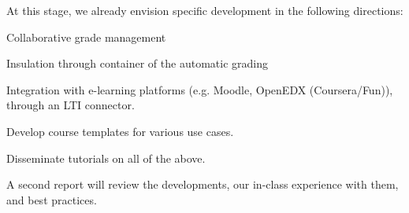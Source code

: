 \begin{task}[
  title={Teaching tools, infrastructure, and best practices},
  id=teaching-tools,
  lead=EP,
  PM=21, %
  wphases={0-36},
  partners={UPSUD}
  ]
  At this stage, we already envision specific development in the
  following directions:
  \begin{compactitem}
  \item Collaborative grade management
  \item Insulation through container of the automatic grading
  \item Integration with e-learning platforms (e.g. Moodle, OpenEDX
    (Coursera/Fun)), through an LTI connector.
  \item Develop course templates for various use cases.
  \item Disseminate tutorials on all of the above.
  \end{compactitem}

  A second report  will review the
  developments, our in-class experience with them, and best practices.
\end{task}
